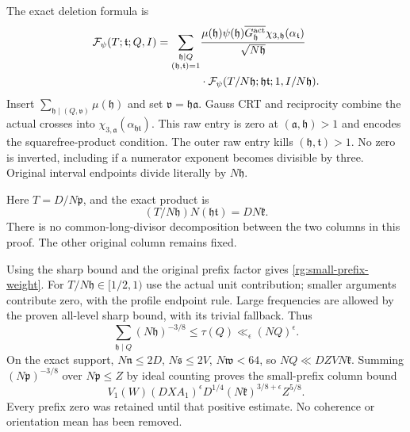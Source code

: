 The exact deletion formula is
\begin{equation}\label{rg:deletion-identity}
 \begin{split}
 \mathcal F_\psi(T;\mathfrak t;Q,I)
 =\sum_{\substack{\mathfrak h\mid Q\\(\mathfrak h,\mathfrak t)=1}}
 &\frac{\mu(\mathfrak h)\psi(\mathfrak h)
       \overline{G_{\mathfrak h}^{\rm act}}
       \chi_{3,\mathfrak h}(\alpha_{\mathfrak t})}
                 {\sqrt{N\mathfrak h}}\\
 &\cdot\mathcal F_\psi(T/N\mathfrak h;
                              \mathfrak h\mathfrak t;1,I/N\mathfrak h).
 \end{split}
\end{equation}
Insert \(\sum_{\mathfrak h\mid(Q,\mathfrak v)}\mu(\mathfrak h)\)
and set \(\mathfrak v=\mathfrak h\mathfrak a\).
Gauss CRT and reciprocity combine the actual crosses into
\(\chi_{3,\mathfrak a}(\alpha_{\mathfrak h\mathfrak t})\).
This raw entry is zero at \((\mathfrak a,\mathfrak h)>1\)
and encodes the squarefree-product condition. The outer raw entry
kills \((\mathfrak h,\mathfrak t)>1\).
No zero is inverted, including if a numerator exponent becomes
divisible by three. Original interval endpoints divide literally
by \(N\mathfrak h\).

Here \(T=D/N\mathfrak p\), and the exact product is
\begin{equation}\label{rg:deletion-product}
 (T/N\mathfrak h)N(\mathfrak h\mathfrak t)=D N\mathfrak k .
\end{equation}
There is no common-long-divisor decomposition between the two
columns in this proof. The other original column remains fixed.

Using the sharp bound and the original prefix factor gives
\eqref{rg:small-prefix-weight}.
For \(T/N\mathfrak h\in[1/2,1)\) use the actual unit contribution;
smaller arguments contribute zero, with the profile endpoint rule.
Large frequencies are allowed by the proven all-level sharp bound,
with its trivial fallback. Thus
\[
 \sum_{\mathfrak h\mid Q}(N\mathfrak h)^{-3/8}
 \le\tau(Q)\ll_\epsilon(NQ)^\epsilon .
\]
On the exact support,
\(N\mathfrak n\le2D\), \(N\mathfrak s\le2V\), \(N\mathfrak w<64\),
so \(NQ\ll DZV N\mathfrak k\).
Summing \((N\mathfrak p)^{-3/8}\) over \(N\mathfrak p\le Z\)
by ideal counting proves the small-prefix column bound
\begin{equation}\label{rg:small-prefix}
 V_1(W)(DXA_1)^\epsilon
                  D^{1/4}(N\mathfrak k)^{3/8+\epsilon}Z^{5/8}.
\end{equation}
Every prefix zero was retained until that positive estimate.
No coherence or orientation mean has been removed.

